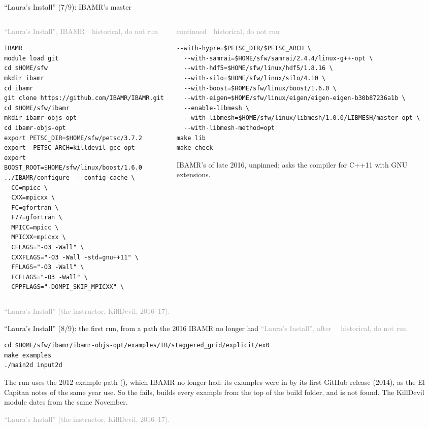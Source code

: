 \documentclass[aspectratio=169,11pt]{beamer}
\newcommand{\sourcecredit}[1]{\vfill\begin{flushright}\tiny\textcolor{DarkGray}{#1}\end{flushright}}
\newcommand{\hist}[1]{{\tiny\sffamily\textcolor{DarkGray}{#1\ \textbullet\ historical, do not run}}\par\nointerlineskip\vspace{0.3mm}}
\begin{document}
\begin{frame}[fragile]{``Laura's Install'' (7/9): IBAMR's master}
\label{fr:li6}
\begin{columns}[T,onlytextwidth]
\begin{column}{0.48\textwidth}
\hist{``Laura's Install'', IBAMR}
\begin{lstlisting}[style=hist]
IBAMR
module load git
cd $HOME/sfw
mkdir ibamr
cd ibamr
git clone https://github.com/IBAMR/IBAMR.git
cd $HOME/sfw/ibamr
mkdir ibamr-objs-opt
cd ibamr-objs-opt
export PETSC_DIR=$HOME/sfw/petsc/3.7.2
export  PETSC_ARCH=killdevil-gcc-opt
export BOOST_ROOT=$HOME/sfw/linux/boost/1.6.0
../IBAMR/configure  --config-cache \
  CC=mpicc \
  CXX=mpicxx \
  FC=gfortran \
  F77=gfortran \
  MPICC=mpicc \
  MPICXX=mpicxx \
  CFLAGS="-O3 -Wall" \
  CXXFLAGS="-O3 -Wall -std=gnu++11" \
  FFLAGS="-O3 -Wall" \
  FCFLAGS="-O3 -Wall" \
  CPPFLAGS="-DOMPI_SKIP_MPICXX" \
\end{lstlisting}
\end{column}
\begin{column}{0.49\textwidth}
\hist{continued}
\begin{lstlisting}[style=hist]
  --with-hypre=$PETSC_DIR/$PETSC_ARCH \
  --with-samrai=$HOME/sfw/samrai/2.4.4/linux-g++-opt \
  --with-hdf5=$HOME/sfw/linux/hdf5/1.8.16 \
  --with-silo=$HOME/sfw/linux/silo/4.10 \
  --with-boost=$HOME/sfw/linux/boost/1.6.0 \
  --with-eigen=$HOME/sfw/linux/eigen/eigen-eigen-b30b87236a1b \
  --enable-libmesh \
  --with-libmesh=$HOME/sfw/linux/libmesh/1.0.0/LIBMESH/master-opt \
  --with-libmesh-method=opt
make lib
make check
\end{lstlisting}
\scriptsize IBAMR's  of late 2016, unpinned;  asks the compiler for C++11 with GNU extensions.
\end{column}
\end{columns}
\sourcecredit{``Laura's Install'' (the instructor, KillDevil, 2016--17).}
\end{frame}

\begin{frame}[fragile]{``Laura's Install'' (8/9): the first run, from a path the 2016 IBAMR no longer had}
\label{fr:li6b}
\hist{``Laura's Install'', after \code{make check}}
\begin{lstlisting}[style=hist]
cd $HOME/sfw/ibamr/ibamr-objs-opt/examples/IB/staggered_grid/explicit/ex0
make examples
./main2d input2d
\end{lstlisting}
\vspace{1mm}
\small The run uses the 2012 example path (), which IBAMR no longer had: its examples were in  by its first GitHub release (2014), as the El Capitan notes of the same year use. So the  fails,  builds every example from the top of the build folder, and  is not found. The KillDevil module  dates from the same November.
\sourcecredit{``Laura's Install'' (the instructor, KillDevil, 2016--17).}
\end{frame}
\end{document}
